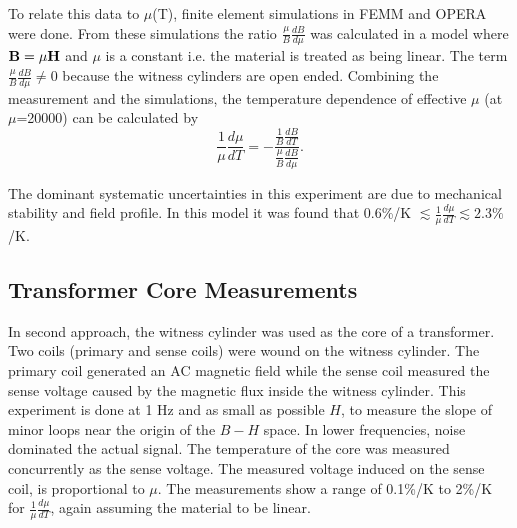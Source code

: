 \documentclass[review]{elsarticle}
\begin{document}
To relate this data to $\mu $(T), finite element simulations in FEMM and OPERA were done. From these simulations the ratio $\frac{\mu}{B} \frac{dB}{d\mu}$ was calculated in a model where $\bold{B} = \mu \bold{H}$ and $\mu $ is a constant i.e. the material is treated as being linear. The term $\frac{\mu}{B}\frac{dB}{d\mu}\neq 0$ because the witness cylinders are open ended. Combining the measurement and the simulations, the temperature dependence of effective $\mu$ (at $\mu$=20000) can be calculated by
\begin{equation}
\frac{1}{\mu}\frac{d\mu}{dT}= -\frac{\frac{1}{B}\frac{dB}{dT}}{\frac{\mu}{B}\frac{dB}{d\mu}}.
\end{equation}

The dominant systematic uncertainties in this experiment are due to mechanical stability and field profile.  In this model it was found that 0.6\%/K $\lesssim\frac{1}{\mu}\frac{d\mu}{dT}\lesssim 2.3\%$/K.

\subsection{Transformer Core Measurements}
In second approach, the witness cylinder was used as the core of a transformer. Two coils (primary and sense coils) were wound on the witness cylinder. The primary coil generated an AC magnetic field while the sense coil measured the sense voltage caused by the magnetic flux inside the witness cylinder. This experiment is done at 1 Hz and as small as possible $H$, to measure the slope of minor loops near the origin of the $B-H$ space. In lower frequencies, noise dominated the actual signal.
The temperature of the core was measured concurrently as the sense voltage.
The measured voltage induced on the sense coil, is proportional to $\mu$.
The measurements show a range of 0.1\%/K to 2\%/K for $\frac{1}{\mu}\frac{d\mu}{dT}$, again assuming the material to be linear.
\end{document}
